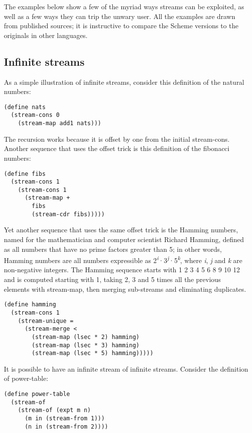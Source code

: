 The examples below show a few of the myriad ways streams can be
exploited, as well as a few ways they can trip the unwary user. All the
examples are drawn from published sources; it is instructive to compare
the Scheme versions to the originals in other languages.

\subsection{Infinite streams}\label{infinite-streams}

As a simple illustration of infinite streams, consider this definition
of the natural numbers:

\begin{verbatim}
(define nats
  (stream-cons 0
    (stream-map add1 nats)))
\end{verbatim}

The recursion works because it is offset by one from the initial
stream-cons. Another sequence that uses the offset trick is this
definition of the fibonacci numbers:

\begin{verbatim}
(define fibs
  (stream-cons 1
    (stream-cons 1
      (stream-map +
        fibs
        (stream-cdr fibs)))))
\end{verbatim}

Yet another sequence that uses the same offset trick is the Hamming
numbers, named for the mathematician and computer scientist Richard
Hamming, defined as all numbers that have no prime factors greater than
5; in other words, Hamming numbers are all numbers expressible as
2\textsuperscript{\emph{i}}·3\textsuperscript{\emph{j}}·5\textsuperscript{\emph{k}},
where \emph{i}, \emph{j} and \emph{k} are non-negative integers. The
Hamming sequence starts with 1 2 3 4 5 6 8 9 10 12 and is computed
starting with 1, taking 2, 3 and 5 times all the previous elements with
stream-map, then merging sub-streams and eliminating duplicates.

\begin{verbatim}
(define hamming
  (stream-cons 1
    (stream-unique =
      (stream-merge <
        (stream-map (lsec * 2) hamming)
        (stream-map (lsec * 3) hamming)
        (stream-map (lsec * 5) hamming)))))
\end{verbatim}

It is possible to have an infinite stream of infinite streams. Consider
the definition of power-table:

\begin{verbatim}
(define power-table
  (stream-of
    (stream-of (expt m n)
      (m in (stream-from 1)))
      (n in (stream-from 2))))
\end{verbatim}


